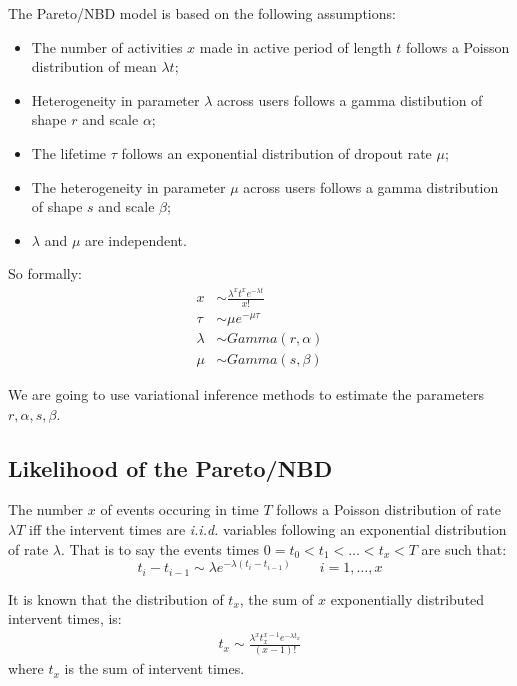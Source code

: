 \documentclass{tufte-book}
\begin{document}
The Pareto/NBD model is based on the following assumptions:
\begin{itemize}
\item The number of activities $x$ made in active period of length
  $t$ follows a Poisson distribution of mean $\lambda t$;
\item Heterogeneity in parameter $\lambda$ across users follows a
  gamma distibution of shape $r$ and scale $\alpha$;
\item The lifetime $\tau$ follows an exponential distribution of
  dropout rate $\mu$;
\item The heterogeneity in parameter $\mu$ across users follows a
  gamma distribution of shape $s$ and scale $\beta$;
\item $\lambda$ and $\mu$ are independent.
\end{itemize}

So formally:
\begin{align*}
x & \sim \frac{\lambda^x t^x e^{-\lambda t}}{x !} \\
\tau & \sim \mu e^{-\mu \tau} \\
\lambda & \sim Gamma(r,\alpha) \\
\mu & \sim Gamma(s, \beta)
\end{align*}

We are going to use variational inference methods to estimate the
parameters $r,\alpha, s, \beta$.

\subsection{Likelihood of the Pareto/NBD}
\label{sub:likelihood_of_the_pareto_nbd}

The number $x$ of events occuring in time $T$ follows a Poisson
distribution of rate $\lambda T$ iff the intervent times are
\emph{i.i.d.}  variables following an exponential distribution of rate
$\lambda$. That is to say the events times $0=t_0 < t_1 < \ldots < t_x
<T$ are such that:
$$t_i - t_{i-1} \sim \lambda e^{-\lambda (t_i - t_{i-1})} \qquad
i=1,\ldots,x $$

It is known that the distribution of $t_x$, the sum of $x$
exponentially distributed intervent times, is:
\begin{align*}
  t_x \sim \frac{\lambda^x t_x^{x-1} e^{-\lambda t_x}}{(x-1)!}
\end{align*}
where $t_x$ is the sum of intervent times.
\end{document}
